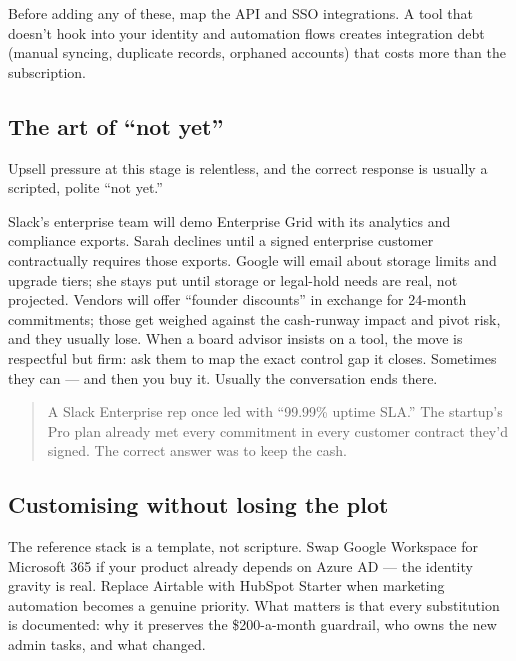Before adding any of these, map the API and SSO integrations. A tool that doesn't hook into your identity and automation flows creates integration debt (manual syncing, duplicate records, orphaned accounts) that costs more than the subscription.



\subsection{The art of ``not yet''}


Upsell pressure at this stage is relentless, and the correct response is usually a scripted, polite ``not yet.''


Slack's enterprise team will demo Enterprise Grid with its analytics and compliance exports. Sarah declines until a signed enterprise customer contractually requires those exports. Google will email about storage limits and upgrade tiers; she stays put until storage or legal-hold needs are real, not projected. Vendors will offer ``founder discounts'' in exchange for 24-month commitments; those get weighed against the cash-runway impact and pivot risk, and they usually lose. When a board advisor insists on a tool, the move is respectful but firm: ask them to map the exact control gap it closes. Sometimes they can — and then you buy it. Usually the conversation ends there.



\begin{quote}\small
A Slack Enterprise rep once led with ``99.99\% uptime SLA.'' The startup's Pro plan already met every commitment in every customer contract they'd signed. The correct answer was to keep the cash.
\end{quote}



\subsection{Customising without losing the plot}


The reference stack is a template, not scripture. Swap Google Workspace for Microsoft 365 if your product already depends on Azure AD — the identity gravity is real. Replace Airtable with HubSpot Starter when marketing automation becomes a genuine priority. What matters is that every substitution is documented: why it preserves the \$200-a-month guardrail, who owns the new admin tasks, and what changed.


